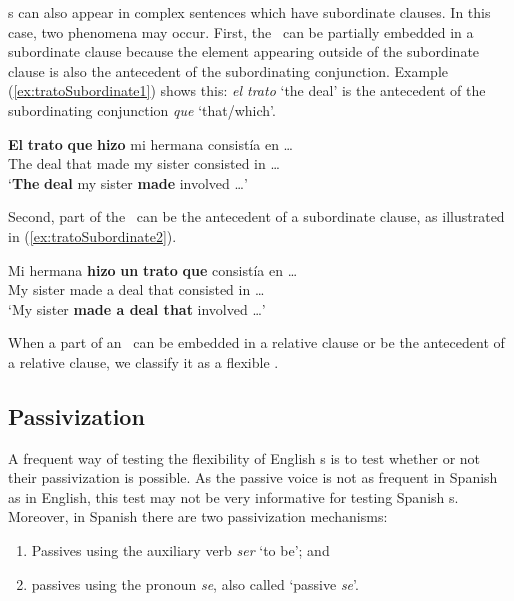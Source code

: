 \documentclass[output=paper]{langsci/langscibook}
\begin{document}
\mwe s can also appear in complex sentences which have subordinate clauses.
In this case, two phenomena may occur.
First, the \mwe\ can be partially embedded in a subordinate clause because the element appearing outside of the subordinate clause is also the antecedent of the subordinating conjunction.
Example (\ref{ex:tratoSubordinate1}) shows this: \textit{el trato} `the deal' is the antecedent of the subordinating conjunction \textit{que} `that/which'.

\begin{exe}
\ex \label{ex:tratoSubordinate1}
\gll \textbf{El} \textbf{trato} \textbf{que} \textbf{hizo} mi hermana consistía en \ldots \\
The deal that made my sister consisted in \ldots\\
\glt `\textbf{The} \textbf{deal} my sister \textbf{made} involved \ldots'
\end{exe}

Second, part of the \mwe\ can be the antecedent of a subordinate clause, as illustrated in (\ref{ex:tratoSubordinate2}). 

\begin{exe}
\ex \label{ex:tratoSubordinate2}
\gll Mi hermana \textbf{hizo} \textbf{un} \textbf{trato} \textbf{que} consistía en \ldots\\
My sister made a deal that consisted in \ldots\\
\glt `My sister \textbf{made a deal that} involved \ldots'
\end{exe}

When a part of an \mwe\ can be embedded in a relative clause or be the antecedent of a relative clause, we classify it as a flexible \mwe. 

\subsection{Passivization}
\label{ssec:passivization}

A frequent way of testing the flexibility of English \mwe s is to test whether or not their passivization is possible.
As the passive voice is not as frequent in Spanish as in English, this test may not be very informative for testing Spanish \mwe s.
Moreover, in Spanish there are two passivization mechanisms:

\begin{enumerate}
\item Passives using the auxiliary verb \textit{ser} `to be'; and
\item passives using the pronoun \textit{se}, also called `passive \textit{se}'.
\end{enumerate}
\end{document}
